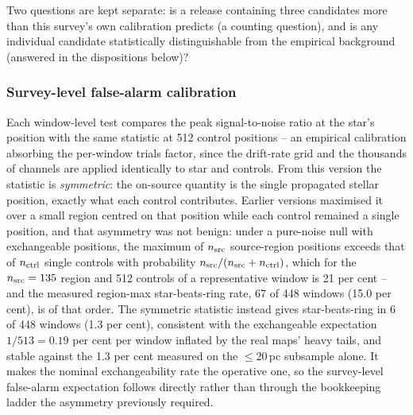 \documentclass{openjournal}
\begin{document}
Two questions are kept separate: is a release containing three
candidates more than this survey's own calibration predicts (a
counting question), and is any individual candidate statistically
distinguishable from the empirical background (answered in the
dispositions below)?

\subsubsection*{Survey-level false-alarm calibration}

Each window-level test compares the peak signal-to-noise ratio at the
star's position with the same statistic at 512 control positions --
an empirical calibration absorbing the per-window trials factor, since
the drift-rate grid and the thousands of channels are applied
identically to star and controls. From this version the statistic is
\emph{symmetric}: the on-source quantity is the single propagated
stellar position, exactly what each control contributes. Earlier
versions maximised it over a small region centred on that position
while each control remained a single position, and that asymmetry was
not benign: under a pure-noise null with exchangeable positions, the
maximum of $n_{\rm src}$ source-region positions exceeds that of
$n_{\rm ctrl}$ single controls with probability
$n_{\rm src}/(n_{\rm src}+n_{\rm ctrl})$, which for the
$n_{\rm src}=135$ region and 512 controls of a representative window
is 21 per cent -- and the measured region-max star-beats-ring rate,
67 of 448 windows (15.0 per cent), is of that order. The symmetric
statistic instead gives star-beats-ring in 6 of 448 windows (1.3 per
cent), consistent with the exchangeable expectation $1/513=0.19$ per
cent per window inflated by the real maps' heavy tails, and stable
against the 1.3 per cent measured on the $\le$20\,pc subsample alone.
It makes the nominal exchangeability rate the operative one, so the
survey-level false-alarm expectation follows directly rather than
through the bookkeeping ladder the asymmetry previously required.
\end{document}
